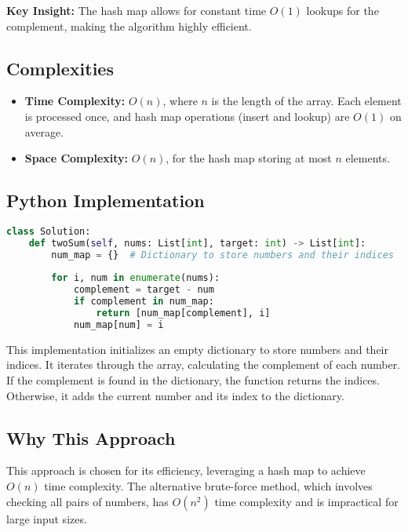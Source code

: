 \textbf{Key Insight:} The hash map allows for constant time \( O(1) \) lookups for the complement, making the algorithm highly efficient.

\subsection*{Complexities}
\begin{itemize}
    \item \textbf{Time Complexity:} \( O(n) \), where \( n \) is the length of the array. Each element is processed once, and hash map operations (insert and lookup) are \( O(1) \) on average.
    \item \textbf{Space Complexity:} \( O(n) \), for the hash map storing at most \( n \) elements.
\end{itemize}

\subsection*{Python Implementation}
\begin{fullwidth}
\begin{lstlisting}[language=Python]
class Solution:
    def twoSum(self, nums: List[int], target: int) -> List[int]:
        num_map = {}  # Dictionary to store numbers and their indices
        
        for i, num in enumerate(nums):
            complement = target - num
            if complement in num_map:
                return [num_map[complement], i]
            num_map[num] = i
\end{lstlisting}
\end{fullwidth}

This implementation initializes an empty dictionary to store numbers and their indices. It iterates through the array, calculating the complement of each number. If the complement is found in the dictionary, the function returns the indices. Otherwise, it adds the current number and its index to the dictionary.

\subsection*{Why This Approach}
This approach is chosen for its efficiency, leveraging a hash map to achieve \( O(n) \) time complexity. The alternative brute-force method, which involves checking all pairs of numbers, has \( O(n^2) \) time complexity and is impractical for large input sizes.

